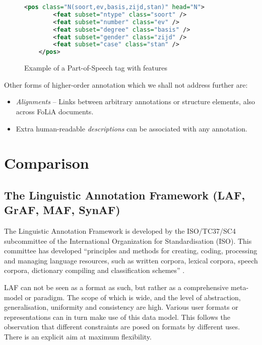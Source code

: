 \documentclass[a4paper,10pt,twoside]{article}
\begin{document}
\begin{figure}[tbh]
\label{fig:features}
\begin{lstlisting}[language=xml]
    <pos class="N(soort,ev,basis,zijd,stan)" head="N">
        <feat subset="ntype" class="soort" />
        <feat subset="number" class="ev" />
        <feat subset="degree" class="basis" />
        <feat subset="gender" class="zijd" />
        <feat subset="case" class="stan" />
    </pos>
\end{lstlisting}
\caption{Example of a Part-of-Speech tag with features}
\end{figure}

Other forms of higher-order annotation which we shall not address further are:

\begin{itemize}
  \item \emph{Alignments} -- Links \cite{XLINK} between arbitrary annotations or structure
elements, also across FoLiA documents.  
  \item Extra human-readable \emph{descriptions} can be associated with any annotation.
\end{itemize}


\section{Comparison}
\label{sec:comparison}

\subsection{The Linguistic Annotation Framework (LAF, GrAF, MAF, SynAF)}
\label{sec:LAF}

The Linguistic Annotation Framework is developed by the ISO/TC37/SC4
subcommittee of the International Organization for Standardisation (ISO). This
committee has developed ``principles and methods for creating, coding,
processing and managing language resources, such as written corpora, lexical
corpora, speech corpora, dictionary compiling and classification schemes''
\cite{LAF}. 

LAF can not be seen as a format as such, but rather as a comprehensive 
meta-model or paradigm. The scope of which is wide, and the level of abstraction,
generalisation, uniformity and consistency are high. Various user formats or
representations can in turn make use of this data model. This follows the
observation that different constraints are posed on formats by different uses.
There is an explicit aim at maximum flexibility. 
\end{document}
